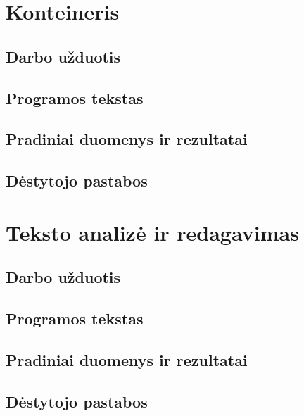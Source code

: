 \documentclass{article}
\begin{document}
\newpage


\section{Konteineris}
\subsection{Darbo užduotis}
\subsection{Programos tekstas}
\subsection{Pradiniai duomenys ir rezultatai}
\subsection{Dėstytojo pastabos}
\newpage


\section{Teksto analizė ir redagavimas}
\subsection{Darbo užduotis}
\subsection{Programos tekstas}
\subsection{Pradiniai duomenys ir rezultatai}
\subsection{Dėstytojo pastabos}
\newpage
\end{document}
